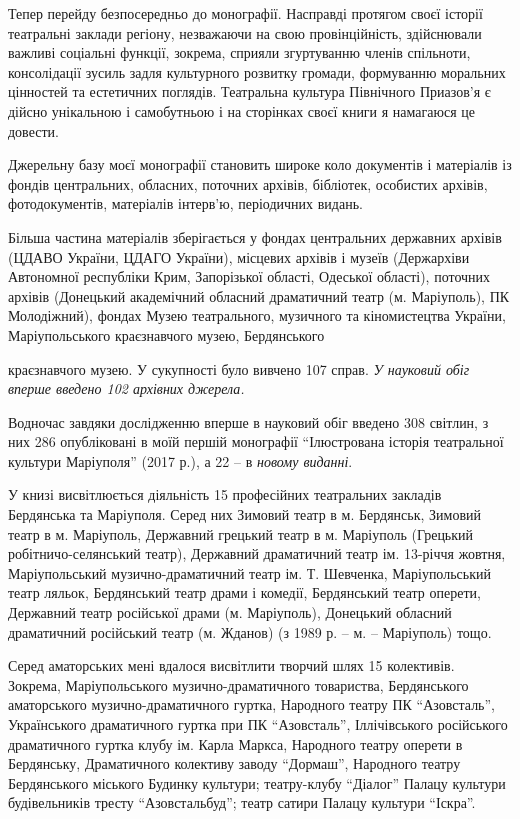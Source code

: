 
Тепер перейду безпосередньо до монографії. Насправді протягом своєї історії
театральні заклади регіону, незважаючи на свою провінційність, здійснювали
важливі соціальні функції, зокрема, сприяли згуртуванню членів спільноти,
консолідації зусиль задля культурного розвитку громади, формуванню моральних
цінностей та естетичних поглядів. Театральна культура Північного Приазов'я є
дійсно унікальною і самобутньою і на сторінках своєї книги я намагаюся це
довести.

Джерельну базу моєї монографії становить широке коло документів і матеріалів із
фондів центральних, обласних, поточних архівів, бібліотек, особистих архівів,
фотодокументів, матеріалів інтерв'ю, періодичних видань.

Більша частина матеріалів зберігається у фондах центральних державних архівів
(ЦДАВО України, ЦДАГО України), місцевих архівів і музеїв (Держархіви
Автономної республіки Крим, Запорізької області, Одеської області), поточних
архівів (Донецький академічний обласний драматичний театр (м. Маріуполь), ПК
Молодіжний), фондах Музею театрального, музичного та кіномистецтва України,
Маріупольського краєзнавчого музею, Бердянського\par\noindent краєзнавчого музею. У
сукупності було вивчено 107 справ. \emph{У науковий обіг вперше введено 102 архівних
джерела.}

Водночас завдяки дослідженню вперше в науковий обіг введено 308 світлин, з них
286 опубліковані в моїй першій монографії \enquote{Ілюстрована історія театральної
культури Маріуполя} (2017 р.), а 22 – в \emph{новому виданні}.

У книзі висвітлюється діяльність 15 професійних театральних закладів Бердянська
та Маріуполя. Серед них Зимовий театр в м. Бердянськ, Зимовий театр в м.
Маріуполь, Державний грецький театр в м. Маріуполь (Грецький
робітничо-селянський театр), Державний драматичний театр ім. 13-річчя жовтня,
Маріупольський музично-драматичний театр ім. Т. Шевченка, Маріупольський театр
ляльок, Бердянський театр драми і комедії,  Бердянський театр оперети,
Державний театр російської драми (м. Маріуполь), Донецький обласний драматичний
російський театр (м. Жданов) (з 1989 р. – м. – Маріуполь) тощо.

Серед аматорських мені вдалося висвітлити творчий шлях 15 колективів. Зокрема,
Маріупольського музично-драматичного товариства, Бердянського аматорського
музично-драматичного гуртка, Народного театру ПК \enquote{Азовсталь}, Українського
драматичного гуртка при ПК \enquote{Азовсталь}, Іллічівського російського драматичного
гуртка клубу ім. Карла Маркса, Народного театру оперети в Бердянську,
Драматичного колективу заводу \enquote{Дормаш}, Народного театру Бердянського міського
Будинку культури; театру-клубу \enquote{Діалог} Палацу культури будівельників тресту
\enquote{Азовстальбуд}; театр сатири Палацу культури \enquote{Іскра}.

